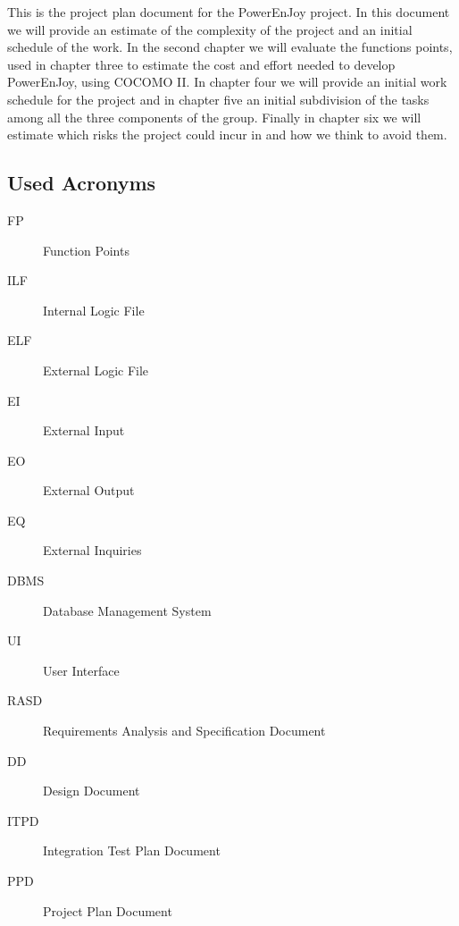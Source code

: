 This is the project plan document for the PowerEnJoy project. In this document we will provide an estimate of the complexity of the project and an initial schedule of the work. In the second chapter we will evaluate the functions points, used in chapter three to estimate the cost and effort needed to develop PowerEnJoy, using COCOMO II. In chapter four we will provide an initial work schedule for the project and in chapter five an initial subdivision of the tasks among all the three components of the group. Finally in chapter six we will estimate which risks the project could incur in and how we think to avoid them. 

\subsection{Used Acronyms}
\begin{description}
\item[FP] Function Points
\item[ILF] Internal Logic File
\item[ELF] External Logic File
\item[EI] External Input
\item[EO] External Output
\item[EQ] External Inquiries
\item[DBMS] Database Management System
\item[UI] User Interface
\item[RASD] Requirements Analysis and Specification Document
\item[DD] Design Document
\item[ITPD] Integration Test Plan Document
\item[PPD] Project Plan Document
\end{description}
